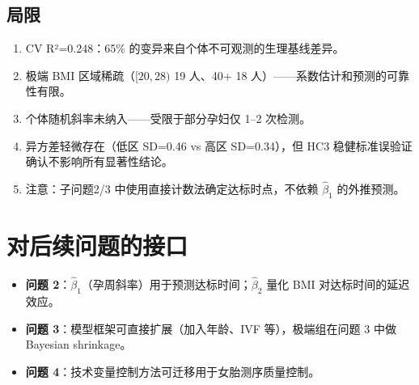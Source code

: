\documentclass{internal-report}
\begin{document}
\subsection{局限}
\begin{enumerate}
    \item CV R²=0.248：65\% 的变异来自个体不可观测的生理基线差异。
    \item 极端 BMI 区域稀疏（$[20,28)$ 19 人、40+ 18 人）——系数估计和预测的可靠性有限。
    \item 个体随机斜率未纳入——受限于部分孕妇仅 1--2 次检测。
    \item 异方差轻微存在（低区 SD=0.46 vs 高区 SD=0.34），但 HC3 稳健标准误验证确认不影响所有显著性结论。
    \item 注意：子问题2/3 中使用直接计数法确定达标时点，不依赖 $\hat{\beta}_1$ 的外推预测。
\end{enumerate}

\section{对后续问题的接口}

\begin{itemize}
    \item \textbf{问题 2}：$\hat{\beta}_1$（孕周斜率）用于预测达标时间；$\hat{\beta}_2$ 量化 BMI 对达标时间的延迟效应。
    \item \textbf{问题 3}：模型框架可直接扩展（加入年龄、IVF 等），极端组在问题 3 中做 Bayesian shrinkage。
    \item \textbf{问题 4}：技术变量控制方法可迁移用于女胎测序质量控制。
\end{itemize}
\end{document}
